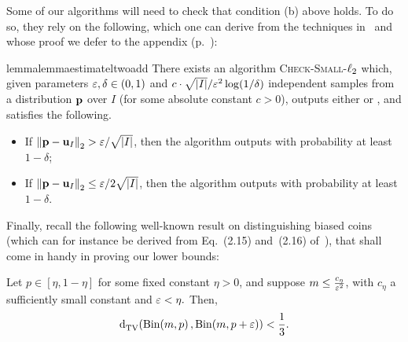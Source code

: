 \noindent Some of our algorithms will need to check that condition \textsf{(b)} above holds. To do so, they rely on the following, which one can derive from the techniques in~\cite{DKN:15} and whose proof we defer to the appendix (p.~\pageref{app:deferred:proofs}):
\begin{restatable}{lemma}{lemmaestimateltwoadd}\label{lemma:estimate:l2:add}
There exists an algorithm \textsc{Check-Small-$\lp[2]$} which, given parameters $\eps,\delta\in(0,1)$ and $c\cdot{\sqrt{\abs{I}}}/{\eps^2} \log(1/\delta)$ independent samples from a distribution $\D$ over $I$ (for some absolute constant $c>0$), outputs either \yes or \no, and satisfies the following.
  \begin{itemize}
    \item If $\normtwo{\D-\uniform_I} > {\eps}/{\sqrt{\abs{I}}}$, then the algorithm outputs \no with probability at least $1-\delta$;
    \item If $\normtwo{\D-\uniform_I} \leq {\eps}/{2\sqrt{\abs{I}}}$, then the algorithm outputs \yes with probability at least $1-\delta$.
  \end{itemize}
\end{restatable}

Finally, recall the following well-known result on distinguishing biased coins (which can for instance be derived from Eq.~(2.15) and~(2.16) of~\cite{AdellJodra:06}), that shall come in handy in proving our lower bounds:
\begin{fact}\label{fact:fair:biased:coin}
Let $p\in[\eta, 1-\eta]$ for some fixed constant $\eta > 0$, and suppose $m\leq\frac{c_\eta}{\eps^2}$, with $c_\eta$ a sufficiently small constant
and $\eps < \eta.$ Then,
\[ \totalvardist{ \binomial{m}{p} }{ \binomial{m}{p+\eps} } < \frac{1}{3}. \]
\end{fact}


